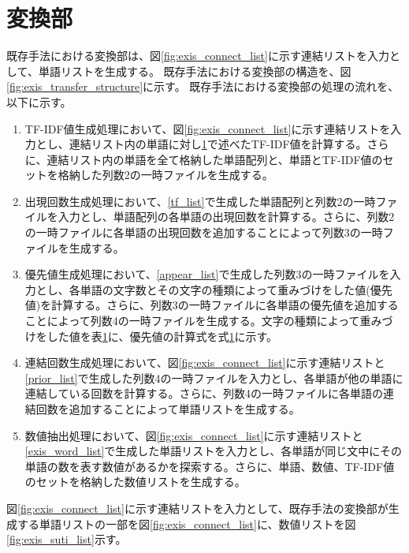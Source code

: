 \section{変換部}
既存手法における変換部は、図\ref{fig:exis_connect_list}に示す連結リストを入力として、単語リストを生成する。
既存手法における変換部の構造を、図\ref{fig:exis_transfer_structure}に示す。
既存手法における変換部の処理の流れを、以下に示す。

\begin{enumerate}
    \item TF-IDF値生成処理において、図\ref{fig:exis_connect_list}に示す連結リストを入力とし、連結リスト内の単語に対し\ref{}で述べたTF-IDF値を計算する。さらに、連結リスト内の単語を全て格納した単語配列と、単語とTF-IDF値のセットを格納した列数2の一時ファイルを生成する。
    \label{tf_list}
    \item 出現回数生成処理において、\ref{tf_list}で生成した単語配列と列数2の一時ファイルを入力とし、単語配列の各単語の出現回数を計算する。さらに、列数2の一時ファイルに各単語の出現回数を追加することによって列数3の一時ファイルを生成する。
    \label{appear_list}
    \item 優先値生成処理において、\ref{appear_list}で生成した列数3の一時ファイルを入力とし、各単語の文字数とその文字の種類によって重みづけをした値(優先値)を計算する。さらに、列数3の一時ファイルに各単語の優先値を追加することによって列数4の一時ファイルを生成する。文字の種類によって重みづけをした値を表\ref{}に、優先値の計算式を式\ref{}に示す。
    \label{prior_list}
    \item 連結回数生成処理において、図\ref{fig:exis_connect_list}に示す連結リストと\ref{prior_list}で生成した列数4の一時ファイルを入力とし、各単語が他の単語に連結している回数を計算する。さらに、列数4の一時ファイルに各単語の連結回数を追加することによって単語リストを生成する。
    \label{exis_word_list}
    \item 数値抽出処理において、図\ref{fig:exis_connect_list}に示す連結リストと\ref{exis_word_list}で生成した単語リストを入力とし、各単語が同じ文中にその単語の数を表す数値があるかを探索する。さらに、単語、数値、TF-IDF値のセットを格納した数値リストを生成する。
\end{enumerate}

図\ref{fig:exis_connect_list}に示す連結リストを入力として、既存手法の変換部が生成する単語リストの一部を図\ref{fig:exis_connect_list}に、数値リストを図\ref{fig:exis_suti_list}示す。

